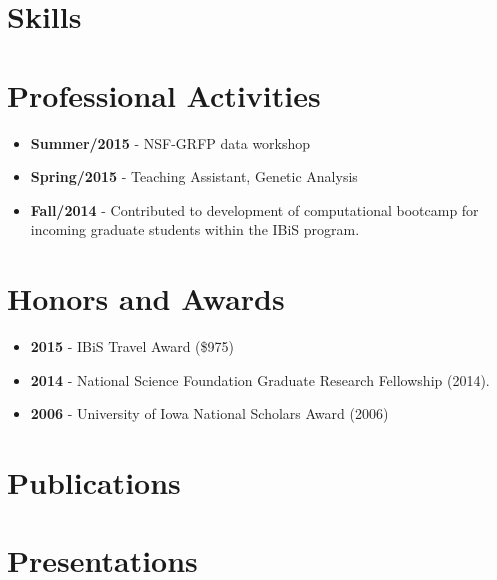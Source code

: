 \documentclass[11pt,a4paper,sans]{moderncv}
\begin{document}
\section{Skills}

\section{Professional Activities}
\begin{itemize}%
\item \textbf{Summer/2015} - NSF-GRFP data workshop
\item \textbf{Spring/2015} - Teaching Assistant, Genetic Analysis
\item \textbf{Fall/2014} - Contributed to development of computational bootcamp for incoming graduate students within the IBiS program.
\end{itemize}

\section{Honors and Awards}
\begin{itemize}%
\item \textbf{2015} - IBiS Travel Award (\$975)
\item \textbf{2014} - National Science Foundation Graduate Research Fellowship (2014). 
\item \textbf{2006} - University of Iowa National Scholars Award (2006)
\end{itemize}


\newpage
\section{Publications}

\nocite{*}


\printbibliography[type=article,heading=none]
\newpage
\section{Presentations}
\begin{refsection}
\nocite{*}
\printbibliography[type=presentation,heading=none]
\end{refsection}
\end{document}
